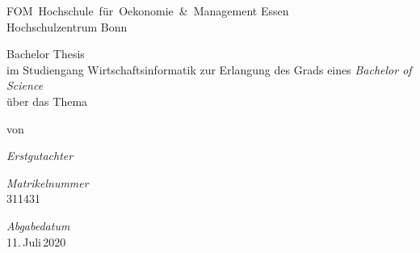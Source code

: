 %

\begin{titlepage}
    \begin{flushleft}
        { %
            \rmfamily
            {
            FOM~Hochschule~für~Oekonomie~\&~Management Essen\\
            Hochschulzentrum Bonn}
        }
        
        \vspace{5.0cm}
        
        {
            \rmfamily
            Bachelor Thesis\\
            im Studiengang Wirtschaftsinformatik
            zur Erlangung des Grads eines \textit{Bachelor of Science}\\
            über das Thema\\
        }

        \vspace{1.0cm}
        
        {
            \LARGE
            \fancyheadline{\texplatetitle}
        }

        \vspace{1.0cm}

        {
            von
        }

        \vspace{1.0cm}

        {
            \large
            \texplateauthor
        }
        
        \vfill
        

        {
            \footnotesize
            \rmfamily

            \textit{Erstgutachter}\\
            \texplatesupervisor

            \vspace{0.3cm}

            \textit{Matrikelnummer}\\
            311431

            \vspace{0.3cm}

            \textit{Abgabedatum}\\
            11.\,Juli\,2020
            
            \rmfamily

        }

    \end{flushleft}
\end{titlepage}
